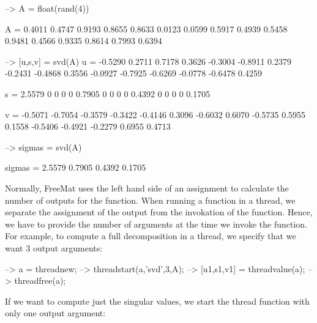 \begin{DoxyVerbInclude}
--> A = float(rand(4))

A = 
    0.4011    0.4747    0.9193    0.8655 
    0.8633    0.0123    0.0599    0.5917 
    0.4939    0.5458    0.9481    0.4566 
    0.9335    0.8614    0.7993    0.6394 

--> [u,s,v] = svd(A)    %
u = 
   -0.5290    0.2711    0.7178    0.3626 
   -0.3004   -0.8911    0.2379   -0.2431 
   -0.4868    0.3556   -0.0927   -0.7925 
   -0.6269   -0.0778   -0.6478    0.4259 

s = 
    2.5579         0         0         0 
         0    0.7905         0         0 
         0         0    0.4392         0 
         0         0         0    0.1705 

v = 
   -0.5071   -0.7054   -0.3579   -0.3422 
   -0.4146    0.3096   -0.6032    0.6070 
   -0.5735    0.5955    0.1558   -0.5406 
   -0.4921   -0.2279    0.6955    0.4713 

--> sigmas = svd(A)     %

sigmas = 
    2.5579 
    0.7905 
    0.4392 
    0.1705 
\end{DoxyVerbInclude}


Normally, Free\-Mat uses the left hand side of an assignment to calculate the number of outputs for the function. When running a function in a thread, we separate the assignment of the output from the invokation of the function. Hence, we have to provide the number of arguments at the time we invoke the function. For example, to compute a full decomposition in a thread, we specify that we want 3 output arguments\-:


\begin{DoxyVerbInclude}
--> a = threadnew;               %
--> threadstart(a,'svd',3,A);    %
--> [u1,s1,v1] = threadvalue(a); %
--> threadfree(a);
\end{DoxyVerbInclude}


If we want to compute just the singular values, we start the thread function with only one output argument\-:


